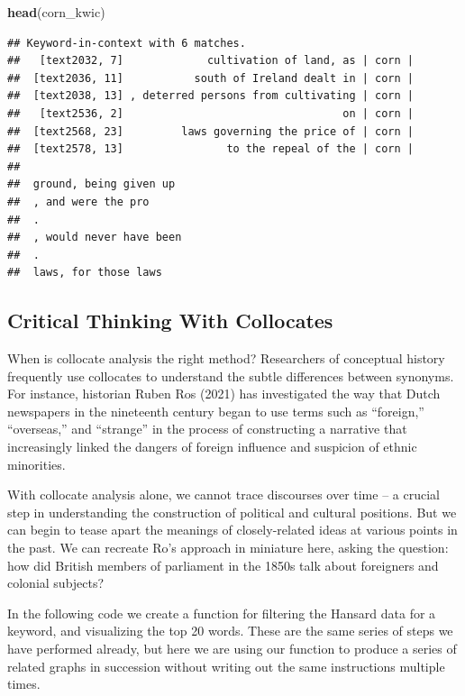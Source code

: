 \documentclass[
]{article}
\newenvironment{Shaded}{\begin{snugshade}}{\end{snugshade}}
\newcommand{\FunctionTok}[1]{\textcolor[rgb]{0.13,0.29,0.53}{\textbf{#1}}}
\newcommand{\NormalTok}[1]{#1}
\begin{document}
\begin{Shaded}
\begin{Highlighting}[]
\FunctionTok{head}\NormalTok{(corn\_kwic)}
\end{Highlighting}
\end{Shaded}

\begin{verbatim}
## Keyword-in-context with 6 matches.                                                            
##   [text2032, 7]             cultivation of land, as | corn |
##  [text2036, 11]           south of Ireland dealt in | corn |
##  [text2038, 13] , deterred persons from cultivating | corn |
##   [text2536, 2]                                  on | corn |
##  [text2568, 23]         laws governing the price of | corn |
##  [text2578, 13]                to the repeal of the | corn |
##                         
##  ground, being given up 
##  , and were the pro     
##  .                      
##  , would never have been
##  .                      
##  laws, for those laws
\end{verbatim}

\subsection{Critical Thinking With
Collocates}\label{critical-thinking-with-collocates}

When is collocate analysis the right method? Researchers of conceptual
history frequently use collocates to understand the subtle differences
between synonyms. For instance, historian Ruben Ros (2021) has
investigated the way that Dutch newspapers in the nineteenth century
began to use terms such as ``foreign,'' ``overseas,'' and ``strange'' in
the process of constructing a narrative that increasingly linked the
dangers of foreign influence and suspicion of ethnic minorities.

With collocate analysis alone, we cannot trace discourses over time -- a
crucial step in understanding the construction of political and cultural
positions. But we can begin to tease apart the meanings of
closely-related ideas at various points in the past. We can recreate
Ro's approach in miniature here, asking the question: how did British
members of parliament in the 1850s talk about foreigners and colonial
subjects?

In the following code we create a function for filtering the Hansard
data for a keyword, and visualizing the top 20 words. These are the same
series of steps we have performed already, but here we are using our
function to produce a series of related graphs in succession without
writing out the same instructions multiple times.
\end{document}

